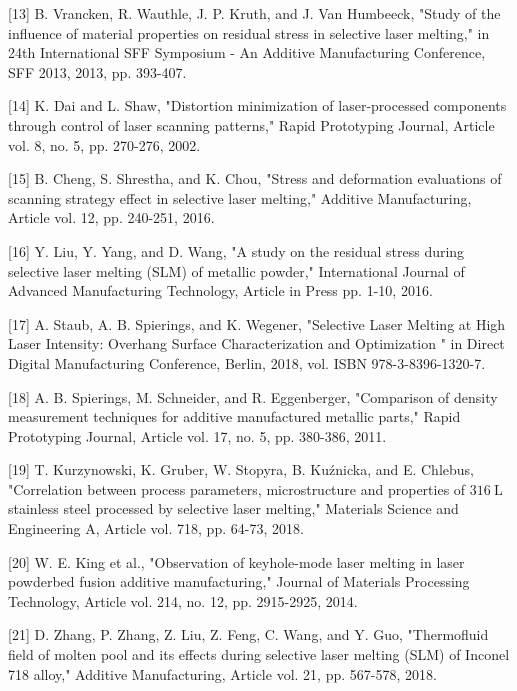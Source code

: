 \documentclass[10pt]{article}
\begin{document}
[13] B. Vrancken, R. Wauthle, J. P. Kruth, and J. Van Humbeeck, "Study of the influence of material properties on residual stress in selective laser melting," in 24th International SFF Symposium - An Additive Manufacturing Conference, SFF 2013, 2013, pp. 393-407.

[14] K. Dai and L. Shaw, "Distortion minimization of laser-processed components through control of laser scanning patterns," Rapid Prototyping Journal, Article vol. 8, no. 5, pp. 270-276, 2002.

[15] B. Cheng, S. Shrestha, and K. Chou, "Stress and deformation evaluations of scanning strategy effect in selective laser melting," Additive Manufacturing, Article vol. 12, pp. 240-251, 2016.

[16] Y. Liu, Y. Yang, and D. Wang, "A study on the residual stress during selective laser melting (SLM) of metallic powder," International Journal of Advanced Manufacturing Technology, Article in Press pp. 1-10, 2016.

[17] A. Staub, A. B. Spierings, and K. Wegener, "Selective Laser Melting at High Laser Intensity: Overhang Surface Characterization and Optimization " in Direct Digital Manufacturing Conference, Berlin, 2018, vol. ISBN 978-3-8396-1320-7.

[18] A. B. Spierings, M. Schneider, and R. Eggenberger, "Comparison of density measurement techniques for additive manufactured metallic parts," Rapid Prototyping Journal, Article vol. 17, no. 5, pp. 380-386, 2011.

[19] T. Kurzynowski, K. Gruber, W. Stopyra, B. Kuźnicka, and E. Chlebus, "Correlation between process parameters, microstructure and properties of $316 \mathrm{~L}$ stainless steel processed by selective laser melting," Materials Science and Engineering A, Article vol. 718, pp. 64-73, 2018.

[20] W. E. King et al., "Observation of keyhole-mode laser melting in laser powderbed fusion additive manufacturing," Journal of Materials Processing Technology, Article vol. 214, no. 12, pp. 2915-2925, 2014.

[21] D. Zhang, P. Zhang, Z. Liu, Z. Feng, C. Wang, and Y. Guo, "Thermofluid field of molten pool and its effects during selective laser melting (SLM) of Inconel 718 alloy," Additive Manufacturing, Article vol. 21, pp. 567-578, 2018.
\end{document}
